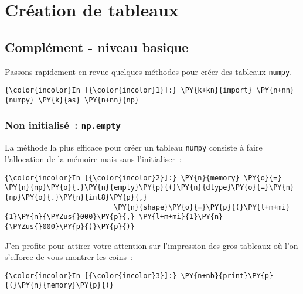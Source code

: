     
    
    
    

    

    \hypertarget{cruxe9ation-de-tableaux}{%
\section{Création de tableaux}\label{cruxe9ation-de-tableaux}}

    \hypertarget{compluxe9ment---niveau-basique}{%
\subsection{Complément - niveau
basique}\label{compluxe9ment---niveau-basique}}

    Passons rapidement en revue quelques méthodes pour créer des tableaux
\texttt{numpy}.

    \begin{Verbatim}[commandchars=\\\{\}]
{\color{incolor}In [{\color{incolor}1}]:} \PY{k+kn}{import} \PY{n+nn}{numpy} \PY{k}{as} \PY{n+nn}{np}
\end{Verbatim}


    \hypertarget{non-initialisuxe9-np.empty}{%
\subsubsection{\texorpdfstring{Non initialisé~:
\texttt{np.empty}}{Non initialisé~: np.empty}}\label{non-initialisuxe9-np.empty}}

    La méthode la plus efficace pour créer un tableau \texttt{numpy}
consiste à faire l'allocation de la mémoire mais sans l'initialiser~:

    \begin{Verbatim}[commandchars=\\\{\}]
{\color{incolor}In [{\color{incolor}2}]:} \PY{n}{memory} \PY{o}{=} \PY{n}{np}\PY{o}{.}\PY{n}{empty}\PY{p}{(}\PY{n}{dtype}\PY{o}{=}\PY{n}{np}\PY{o}{.}\PY{n}{int8}\PY{p}{,}
                          \PY{n}{shape}\PY{o}{=}\PY{p}{(}\PY{l+m+mi}{1}\PY{n}{\PYZus{}000}\PY{p}{,} \PY{l+m+mi}{1}\PY{n}{\PYZus{}000}\PY{p}{)}\PY{p}{)}
\end{Verbatim}


    J'en profite pour attirer votre attention sur l'impression des gros
tableaux où l'on s'efforce de vous montrer les coins~:

    \begin{Verbatim}[commandchars=\\\{\}]
{\color{incolor}In [{\color{incolor}3}]:} \PY{n+nb}{print}\PY{p}{(}\PY{n}{memory}\PY{p}{)}
\end{Verbatim}


